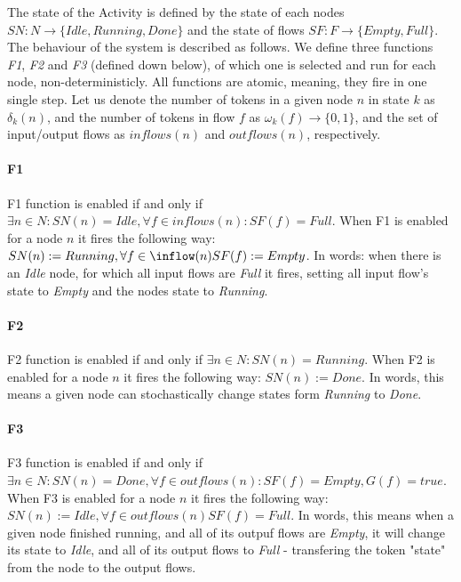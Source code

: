 The state of the Activity is defined by the state of each nodes \(SN : N \rightarrow \{ Idle, Running, Done \}\) and the state of flows \(SF : F \rightarrow \{ Empty, Full \} \). The behaviour of the system is described as follows. We define three functions \emph{F1}, \emph{F2} and \emph{F3} (defined down below), of which one is selected and run for each node, non-deterministicly. All functions are atomic, meaning, they fire in one single step. Let us denote the number of tokens in a given node \(n\) in state \(k\) as \(\delta_k(n)\), and the number of tokens in flow \(f\) as \(\omega_k(f) \rightarrow \{0, 1\} \), and the set of input/output flows as \(inflows(n)\) and \(outflows(n)\), respectively.

\paragraph{F1} 

F1 function is enabled if and only if \( \exists n \in N : SN(n) = Idle, \forall f \in inflows(n) : SF(f) = Full \). When F1 is enabled for a node \(n\) it fires the following way: \( SN(n) := Running, \forall f \in \inflow(n) SF(f) := Empty \). In words: when there is an \emph{Idle} node, for which all input flows are \emph{Full} it fires, setting all input flow's state to \emph{Empty} and the nodes state to \emph{Running}. 

\paragraph{F2} 

F2 function is enabled if and only if \( \exists n \in N : SN(n) = Running \). When F2 is enabled for a node \(n\) it fires the following way: \( SN(n) := Done \). In words, this means a given node can stochastically change states form \emph{Running} to \emph{Done}.

\paragraph{F3} 

F3 function is enabled if and only if \( \exists n \in N : SN(n) = Done, \forall f \in outflows(n) : SF(f) = Empty, G(f) = true \). When F3 is enabled for a node \(n\) it fires the following way: \( SN(n) := Idle, \forall f \in outflows(n) SF(f) = Full \). In words, this means when a given node finished running, and all of its outpuf flows are \emph{Empty}, it will change its state to \emph{Idle}, and all of its output flows to \emph{Full} - transfering the token "state" from the node to the output flows.

